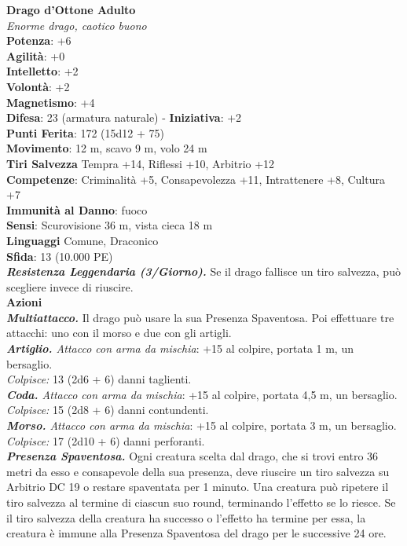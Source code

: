 \begin{multicols}{2}
\medskip\textbf{Drago d'Ottone Adulto}\\
\emph{Enorme drago, caotico buono}\\
\textbf{Potenza}: +6\\
\textbf{Agilità}: +0\\
\textbf{Intelletto}: +2\\
\textbf{Volontà}: +2\\
\textbf{Magnetismo}: +4\\
\textbf{Difesa}: 23 (armatura naturale) - \textbf{Iniziativa}: +2\\
\textbf{Punti Ferita}: 172 (15d12 + 75)\\
\textbf{Movimento}: 12 m, scavo 9 m, volo 24 m\\
\textbf{Tiri Salvezza} Tempra +14, Riflessi +10, Arbitrio +12\\
\textbf{Competenze}: Criminalità +5, Consapevolezza +11, Intrattenere +8, Cultura +7\\
\textbf{Immunità al Danno}: fuoco\\
\textbf{Sensi}: Scurovisione 36 m, vista cieca 18 m\\
\textbf{Linguaggi} Comune, Draconico\\
\textbf{Sfida}: 13 (10.000 PE)\smallskip\\
\emph{\textbf{Resistenza Leggendaria (3/Giorno).}} Se il drago fallisce un tiro salvezza, può scegliere invece di riuscire.\\
\smallskip\textbf{Azioni}\\
\emph{\textbf{Multiattacco.}} Il drago può usare la sua Presenza Spaventosa. Poi effettuare tre attacchi: uno con il morso e due con gli artigli.\\
\emph{\textbf{Artiglio.} Attacco con arma da mischia}: +15 al colpire, portata 1 m, un bersaglio.\\
\emph{Colpisce:} 13 (2d6 + 6) danni taglienti.\\
\emph{\textbf{Coda.} Attacco con arma da mischia}: +15 al colpire, portata 4,5 m, un bersaglio.\\
\emph{Colpisce:} 15 (2d8 + 6) danni contundenti.\\
\emph{\textbf{Morso.} Attacco con arma da mischia}: +15 al colpire, portata 3 m, un bersaglio.\\
\emph{Colpisce:} 17 (2d10 + 6) danni perforanti.\\
\emph{\textbf{Presenza Spaventosa.}} Ogni creatura scelta dal drago, che si trovi entro 36 metri da esso e consapevole della sua presenza, deve riuscire un tiro salvezza su Arbitrio DC  19 o restare spaventata per 1 minuto. Una creatura può ripetere il tiro salvezza al termine di ciascun suo round, terminando l'effetto se lo riesce. Se il tiro salvezza della creatura ha successo o l'effetto ha termine per essa, la creatura è immune alla Presenza Spaventosa del drago per le successive 24 ore.\\

\end{multicols}
